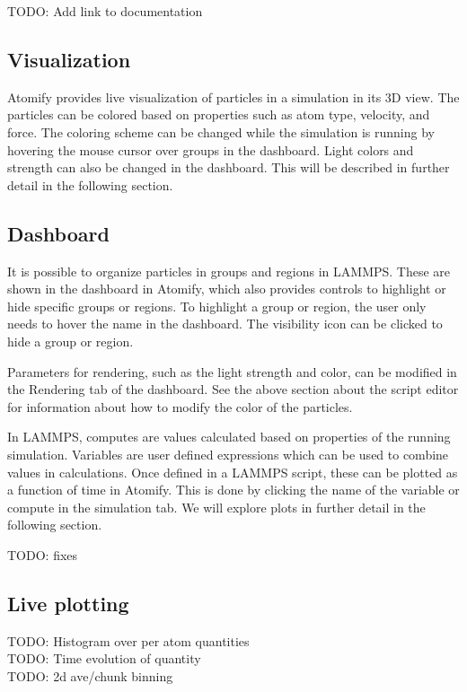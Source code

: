 \documentclass[aps,pre,twocolumn,letterpaper,floatfix]{revtex4}
\begin{document}
TODO: Add link to documentation

\subsection{Visualization}

Atomify provides live visualization of particles in a simulation in its 3D view.
The particles can be colored based on properties such as atom type,
velocity, and force.
The coloring scheme can be changed while the simulation is running by hovering
the mouse cursor over groups in the dashboard.
Light colors and strength can also be changed in the dashboard.
This will be described in further detail in the following section.

\subsection{Dashboard}

It is possible to organize particles in groups and regions in LAMMPS.
These are shown in the dashboard in Atomify, which also provides controls to
highlight or hide specific groups or regions.
To highlight a group or region, the user only needs to hover the name in the
dashboard.
The visibility icon can be clicked to hide a group or region.

Parameters for rendering, such as the light strength and color,
can be modified in the Rendering tab of the dashboard.
See the above section about the script editor for information about how to
modify the color of the particles.

In LAMMPS, computes are values calculated based on properties of the running
simulation.
Variables are user defined expressions which can be used to combine values in
calculations.
Once defined in a LAMMPS script, these can be plotted as a function of time in
Atomify.
This is done by clicking the name of the variable or compute in the simulation
tab.
We will explore plots in further detail in the following section.

TODO: fixes \\

\subsection{Live plotting}
TODO: Histogram over per atom quantities \\
TODO: Time evolution of quantity \\
TODO: 2d ave/chunk binning \\
\end{document}
